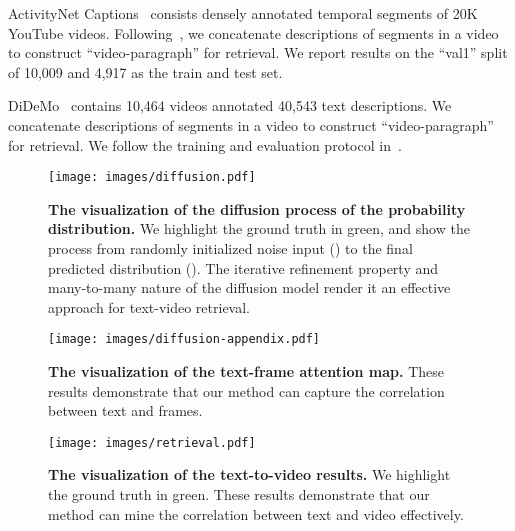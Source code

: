 \documentclass[10pt,twocolumn,letterpaper]{article}
\begin{document}
{ ActivityNet Captions~\cite{krishna2017dense} consists densely annotated temporal segments of 20K YouTube videos. Following~\cite{gabeur2020multi,patrick2021support,wang2021t2vlad}, we concatenate descriptions of segments in a video to construct ``video-paragraph'' for retrieval. We report results on the ``val1'' split of 10,009 and 4,917 as the train and test set. 

 DiDeMo~\cite{anne2017localizing} contains 10,464 videos annotated 40,543 text descriptions. We concatenate descriptions of segments in a video to construct ``video-paragraph'' for retrieval. We follow the training and evaluation protocol in~\cite{luo2021clip4clip}.

\begin{figure*}[tbp]
\centering
\texttt{[image: images/diffusion.pdf]}
\caption{\textbf{The visualization of the diffusion process of the probability distribution.} We highlight the ground truth in green, and show the process from randomly initialized noise input () to the final predicted distribution (). The iterative refinement property and many-to-many nature of the diffusion model render it an effective approach for text-video retrieval.}
\label{fig:v_more}
\end{figure*}

\begin{figure*}[tbp]
\centering
\texttt{[image: images/diffusion-appendix.pdf]}
\caption{\textbf{The visualization of the text-frame attention map.} These results demonstrate that our method can capture the correlation between text and frames.}
\label{fig:t_f_attention}
\end{figure*}

\begin{figure*}[tbp]
\centering
\texttt{[image: images/retrieval.pdf]}
\caption{\textbf{The visualization of the text-to-video results.} We highlight the ground truth in green. These results demonstrate that our method can mine the correlation between text and video effectively.}
\label{fig:retrieval}
\end{figure*}

}
\end{document}

